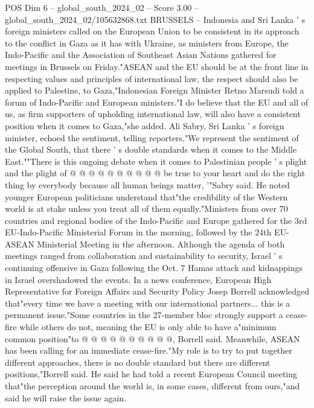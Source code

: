\begin{textsample}{POS Dim 6 – global\_south\_2024\_02 – Score 3.00 – global\_south\_2024\_02/105632868.txt}  \label{ex:f6_pos_188}
BRUSSELS -- Indonesia and Sri Lanka ' s foreign ministers called on the European Union to be consistent in its approach to the conflict in Gaza as it has with Ukraine, as ministers from Europe, the Indo-Pacific and the Association of Southeast Asian Nations gathered for meetings in Brussels on Friday."ASEAN and the EU should be at the front line in respecting values and principles of international law, the respect should also be applied to Palestine, to Gaza,"Indonesian Foreign Minister Retno Marsudi told a forum of Indo-Pacific and European ministers."I do believe that the EU and all of us, as firm supporters of upholding international law, will also have a consistent position when it comes to Gaza,"she added.
Ali Sabry, Sri Lanka ' s foreign minister, echoed the sentiment, telling reporters,"We represent the sentiment of the Global South, that there ' s double standards when it comes to the Middle East.""There is this ongoing debate when it comes to Palestinian people ' s plight and the plight of @ @ @ @ @ @ @ @ @ @ be true to your heart and do the right thing by everybody because all human beings matter, '"Sabry said.
He noted younger European politicians understand that"the credibility of the Western world is at stake unless you treat all of them equally."Ministers from over 70 countries and regional bodies of the Indo-Pacific and Europe gathered for the 3rd EU-Indo-Pacific Ministerial Forum in the morning, followed by the 24th EU-ASEAN Ministerial Meeting in the afternoon.
Although the agenda of both meetings ranged from collaboration and sustainability to security, Israel ' s continuing offensive in Gaza following the Oct. 7 Hamas attack and kidnappings in Israel overshadowed the events.
In a news conference, European High Representative for Foreign Affairs and Security Policy Josep Borrell acknowledged that"every time we have a meeting with our international partners... this is a permanent issue."Some countries in the 27-member bloc strongly support a cease-fire while others do not, meaning the EU is only able to have a"minimum common position"to @ @ @ @ @ @ @ @ @ @, Borrell said.
Meanwhile, ASEAN has been calling for an immediate cease-fire."My role is to try to put together different approaches, there is no double standard but there are different positions,"Borrell said.
He said he had told a recent European Council meeting that"the perception around the world is, in some cases, different from ours,"and said he will raise the issue again.

\end{textsample}
